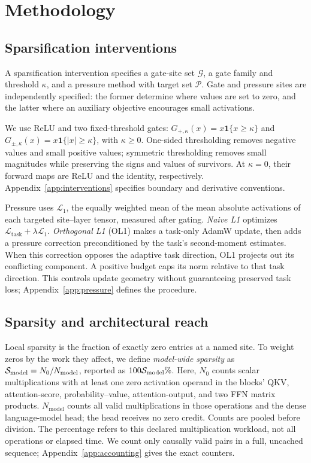 \section{Methodology}
\label{sec:methodology}

\subsection{Sparsification interventions}
\label{sec:interventions}

A sparsification intervention specifies a gate-site set $\mathcal{G}$, a gate
family and threshold $\kappa$, and a pressure method with target set
$\mathcal{P}$. Gate and pressure sites are independently specified: the former
determine where values are set to zero, and the latter where an auxiliary
objective encourages small activations.

We use ReLU and two fixed-threshold gates:
$G_{+,\kappa}(x)=x\mathbf{1}\{x\geq\kappa\}$ and
$G_{\pm,\kappa}(x)=x\mathbf{1}\{|x|\geq\kappa\}$, with $\kappa\geq0$.
One-sided thresholding removes negative values and small positive values;
symmetric thresholding removes small magnitudes while preserving the signs
and values of survivors. At $\kappa=0$, their forward maps are ReLU and the
identity, respectively. Appendix~\ref{app:interventions} specifies boundary
and derivative conventions.

Pressure uses $\mathcal{L}_1$, the equally weighted mean of the mean absolute
activations of each targeted site--layer tensor, measured after gating.
\emph{Naive L1} optimizes $\mathcal{L}_{\mathrm{task}}+\lambda\mathcal{L}_1$.
\emph{Orthogonal L1} (OL1) makes a task-only AdamW update, then adds a pressure
correction preconditioned by the task's second-moment estimates. When this
correction opposes the adaptive task direction, OL1 projects out its
conflicting component. A positive budget caps its norm relative to that task
direction. This controls update geometry without guaranteeing preserved task
loss; Appendix~\ref{app:pressure} defines the procedure.

\subsection{Sparsity and architectural reach}
\label{sec:measurement}

Local sparsity is the fraction of exactly zero entries at a named site.
To weight zeros by the work they affect, we define \emph{model-wide sparsity}
as $\mathcal{S}_{\mathrm{model}}=N_0/N_{\mathrm{model}}$, reported as $100\mathcal{S}_{\mathrm{model}}\%$. Here, $N_0$
counts scalar multiplications with at least one zero activation operand in
the blocks' QKV, attention-score, probability--value, attention-output, and
two FFN matrix products. $N_{\mathrm{model}}$ counts all valid multiplications
in those operations and the dense language-model head; the head receives no
zero credit. Counts are pooled before division. The percentage refers to this
declared multiplication workload, not all operations or elapsed time. We count
only causally valid pairs in a full, uncached sequence;
Appendix~\ref{app:accounting} gives the exact counters.

